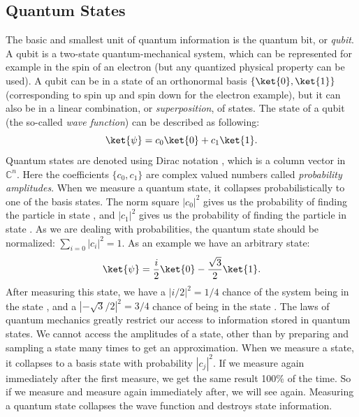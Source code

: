 \documentclass[a4paper,10pt]{article}
\begin{document}
\subsection{Quantum States}
The basic and smallest unit of quantum information is the quantum bit, or \emph{qubit}.
A qubit is a two-state quantum-mechanical system, which can be represented for example in the spin of an electron (but any quantized physical property can be used).
A qubit can be in a state of an orthonormal basis $\{\ket{0}, \ket{1}\}$ (corresponding to spin up and spin down for the electron example), but it can also be in a linear combination, or \emph{superposition}, of states.
The state of a qubit (the so-called \emph{wave function}) can be described as following:
\begin{equation}
\ket{\psi} = c_0\ket{0} + c_1\ket{1}.
\end{equation}
Quantum states are denoted using Dirac notation \ket{\,\cdotp\,}, which is a column vector in $\mathbb{C}^n$.
Here the coefficients $\{c_0, c_1\}$ are complex valued numbers called \emph{probability amplitudes}.
When we measure a quantum state, it collapses probabilistically to one of the basis states.
The norm square $|c_0|^2$ gives us the probability of finding the particle in state , and $|c_1|^2$ gives us the probability of finding the particle in state .
As we are dealing with probabilities, the quantum state should be normalized: $\sum_{i=0}|c_i|^2 = 1$.
As an example we have an arbitrary state:
\begin{equation}
\ket{\psi} = \dfrac{i}{2}\ket{0} - \dfrac{\sqrt3}{2}\ket{1}.
\end{equation}
After measuring this state, we have a $|i/2|^2 = 1/4$ chance of the system being in the state , and a $|{-}\sqrt3/2|^2 = 3/4$ chance of being in the state .
The laws of quantum mechanics greatly restrict our access to information stored in quantum states.
We cannot access the amplitudes of a state, other than by preparing and sampling a state many times to get an approximation. 
When we measure a state, it collapses to a basis state  with probability $|c_j|^2$.
If we measure again immediately after the first measure, we get the same result 100\% of the time.
So if we measure  and measure again immediately after, we will see  again.
Measuring a quantum state collapses the wave function and destroys state information.
\end{document}
